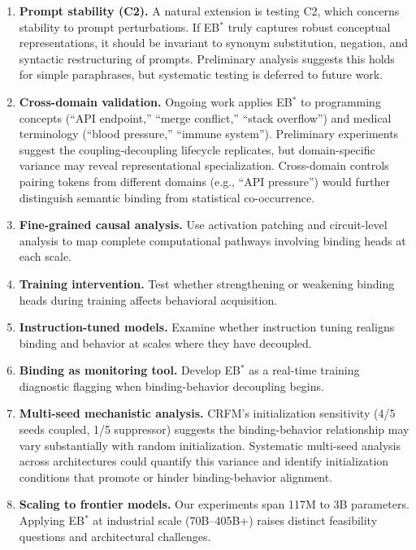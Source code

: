 \documentclass[10pt]{article} %
\begin{document}
\begin{enumerate}
  \item \textbf{Prompt stability (C2).} A natural extension is testing C2, which concerns stability to prompt perturbations. If EB$^*$ truly captures robust conceptual representations, it should be invariant to synonym substitution, negation, and syntactic restructuring of prompts. Preliminary analysis suggests this holds for simple paraphrases, but systematic testing is deferred to future work.

  \item \textbf{Cross-domain validation.} Ongoing work applies EB$^*$ to programming concepts (``API endpoint,'' ``merge conflict,'' ``stack overflow'') and medical terminology (``blood pressure,'' ``immune system''). Preliminary experiments suggest the coupling-decoupling lifecycle replicates, but domain-specific variance may reveal representational specialization. Cross-domain controls pairing tokens from different domains (e.g., ``API pressure'') would further distinguish semantic binding from statistical co-occurrence.

  \item \textbf{Fine-grained causal analysis.} Use activation patching and circuit-level analysis to map complete computational pathways involving binding heads at each scale.

  \item \textbf{Training intervention.} Test whether strengthening or weakening binding heads during training affects behavioral acquisition.

  \item \textbf{Instruction-tuned models.} Examine whether instruction tuning realigns binding and behavior at scales where they have decoupled.

  \item \textbf{Binding as monitoring tool.} Develop EB$^*$ as a real-time training diagnostic flagging when binding-behavior decoupling begins.

  \item \textbf{Multi-seed mechanistic analysis.} CRFM's initialization sensitivity (4/5 seeds coupled, 1/5 suppressor) suggests the binding-behavior relationship may vary substantially with random initialization. Systematic multi-seed analysis across architectures could quantify this variance and identify initialization conditions that promote or hinder binding-behavior alignment.

  \item \textbf{Scaling to frontier models.} Our experiments span 117M to 3B parameters. Applying EB$^*$ at industrial scale (70B--405B+) raises distinct feasibility questions and architectural challenges.


\end{enumerate}
\end{document}

